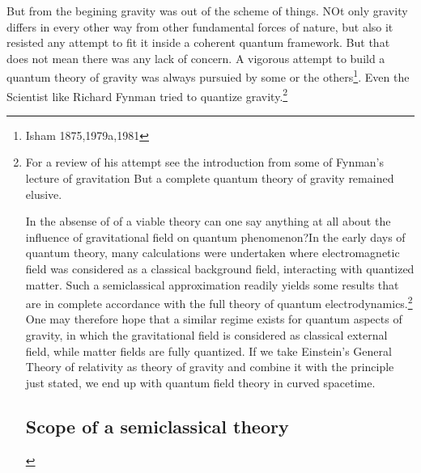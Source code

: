         But from the begining gravity was out of the scheme of things. NOt
        only gravity differs in every other way from other fundamental
        forces of nature, but also it resisted any attempt to fit it
        inside a coherent quantum framework. But that does not mean there
        was any lack of concern. A vigorous attempt to build a quantum
        theory of gravity was always pursuied by some or the
        others\footnote{Isham 1875,1979a,1981}. Even the Scientist like
        Richard Fynman tried to quantize gravity.\footnote{  For a review
        of his attempt see the introduction from some of Fynman's lecture
        of gravitation But a complete quantum theory of gravity remained
        elusive. \par

        In the absense of of a viable theory can one say anything at all
        about the influence of gravitational field on quantum
        phenomenon?In the early days of quantum theory, many calculations
        were undertaken where electromagnetic field was considered as
        a classical background field, interacting with quantized matter.
        Such a semiclassical approximation readily yields some results
        that are in complete accordance with the full theory of quantum
        electrodynamics.\footnote{See for example Shchiff 1949, Chapter
            11} One may therefore hope that a similar regime exists for
            quantum aspects of gravity, in which the gravitational field
            is considered as classical external field, while matter fields
            are fully quantized. If we take Einstein's General Theory of
            relativity as theory of gravity and combine it with the
            principle just stated, we end up with quantum field theory in
            curved spacetime. \par

    
            \section{Scope of a semiclassical theory}
            
}
